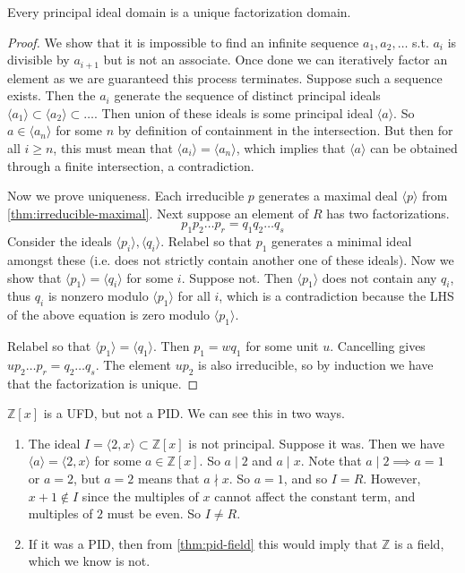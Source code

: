   \begin{theorem}
    Every principal ideal domain is a unique factorization domain. 
  \end{theorem}
  \begin{proof}
    We show that it is impossible to find an infinite sequence $a_1, a_2, \ldots$ s.t. $a_i$ is divisible by $a_{i+1}$ but is not an associate. Once done we can iteratively factor an element as we are guaranteed this process terminates. Suppose such a sequence exists. Then the $a_i$ generate the sequence of distinct principal ideals $\langle a_1 \rangle \subset \langle a_2 \rangle \subset \ldots$. Then union of these ideals is some principal ideal $\langle a \rangle$. So $a \in \langle a_n \rangle$ for some $n$ by definition of containment in the intersection. But then for all $i \geq n$, this must mean that $\langle a_i \rangle = \langle a_n \rangle$, which implies that $\langle a \rangle$ can be obtained through a finite intersection, a contradiction. 

    Now we prove uniqueness. Each irreducible $p$ generates a maximal deal $\langle p \rangle$ from \ref{thm:irreducible-maximal}. Next suppose an element of $R$ has two factorizations. 
    \begin{equation}
      p_1 p_2 \ldots p_r = q_1 q_2 \ldots q_s 
    \end{equation}
    Consider the ideals $\langle p_i \rangle, \langle q_i \rangle$. Relabel so that $p_1$ generates a minimal ideal amongst these (i.e. does not strictly contain another one of these ideals). Now we show that $\langle p_1 \rangle = \langle q_i \rangle$ for some $i$. Suppose not. Then $\langle p_1 \rangle$ does not contain any $q_i$, thus $q_i$ is nonzero modulo $\langle p_1 \rangle$  for all $i$, which is a contradiction because the LHS of the above equation is zero modulo $\langle p_1 \rangle$. 

    Relabel so that $\langle p_1 \rangle = \langle q_1 \rangle$. Then $p_1 = w q_1$ for some unit $u$. Cancelling gives $u p_2 \ldots p_r = q_2 \ldots q_s$. The element $u p_2$ is also irreducible, so by induction we have that the factorization is unique. 
  \end{proof}

  \begin{example}
    $\mathbb{Z}[x]$ is a UFD, but not a PID. We can see this in two ways. 
    \begin{enumerate}
      \item The ideal $I = \langle 2, x \rangle \subset \mathbb{Z}[x]$ is not principal. Suppose it was. Then we have $\langle a \rangle = \langle 2, x \rangle$ for some $a \in \mathbb{Z}[x]$. So $a \mid 2$ and $a \mid x$. Note that $a \mid 2 \implies a = 1$ or $a = 2$, but $a = 2$ means that $a \nmid x$. So $a = 1$, and so $I = R$. However, $x + 1 \not\in I$ since the multiples of $x$ cannot affect the constant term, and multiples of $2$ must be even. So $I \neq R$. 
      \item If it was a PID, then from \ref{thm:pid-field} this would imply that $\mathbb{Z}$ is a field, which we know is not. 
    \end{enumerate}
  \end{example}

